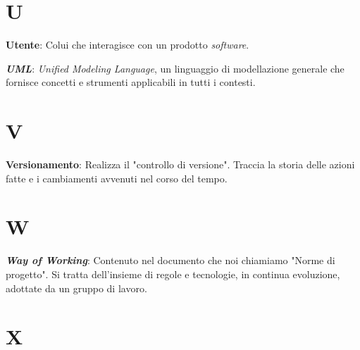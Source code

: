 \documentclass[5pt]{article}
\begin{document}
\pagebreak

\section*{U}
\begin{flushleft}

\textbf{Utente}: Colui che interagisce con un prodotto \textit{software}.\newline

\textbf{\textit{UML}}: \textit{Unified Modeling Language}, un linguaggio di modellazione generale che fornisce concetti e strumenti applicabili in tutti i contesti.\newline

\end{flushleft}

\pagebreak

\section*{V}
\begin{flushleft}
	
\textbf{Versionamento}: Realizza il "controllo di versione". Traccia la storia delle azioni fatte e i cambiamenti avvenuti nel corso del tempo.\newline
	
\end{flushleft}

\pagebreak

\section*{W}
\begin{flushleft}

\textbf{\textit{Way of Working}}: Contenuto nel documento che noi chiamiamo "Norme di progetto". Si tratta dell'insieme di regole e tecnologie, in continua evoluzione, adottate da un gruppo di lavoro.\newline

\end{flushleft}

\pagebreak

\section*{X}
\begin{flushleft}
	
\end{flushleft}
\end{document}
